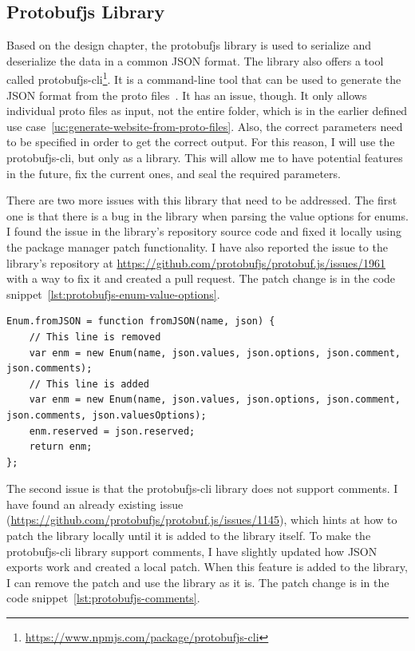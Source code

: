\subsection{Protobufjs Library}
Based on the design chapter, the protobufjs library is used to serialize and deserialize the data in a common JSON format.
The library also offers a tool called protobufjs-cli\footnote{\url{https://www.npmjs.com/package/protobufjs-cli}}.
It is a command-line tool that can be used to generate the JSON format from the proto files~\cite{protobufjs-cli}.
It has an issue, though.
It only allows individual proto files as input, not the entire folder, which is in the earlier defined use case~\ref{uc:generate-website-from-proto-files}.
Also, the correct parameters need to be specified in order to get the correct output.
For this reason, I will use the protobufjs-cli, but only as a library.
This will allow me to have potential features in the future, fix the current ones, and seal the required parameters.

There are two more issues with this library that need to be addressed.
The first one is that there is a bug in the library when parsing the value options for enums.
I found the issue in the library's repository source code and fixed it locally using the package manager patch functionality.
I have also reported the issue to the library's repository at \url{https://github.com/protobufjs/protobuf.js/issues/1961} with a way to fix it and created a pull request.
The patch change is in the code snippet~\ref{lst:protobufjs-enum-value-options}.

\newpage

\begin{lstlisting}[style=JavaScript, caption={protobufjs library enum comments bug fix}, label={lst:protobufjs-enum-value-options}]
Enum.fromJSON = function fromJSON(name, json) {
    // This line is removed
    var enm = new Enum(name, json.values, json.options, json.comment, json.comments);
    // This line is added
    var enm = new Enum(name, json.values, json.options, json.comment, json.comments, json.valuesOptions);
    enm.reserved = json.reserved;
    return enm;
};
\end{lstlisting}

The second issue is that the protobufjs-cli library does not support comments.
I have found an already existing issue (\url{https://github.com/protobufjs/protobuf.js/issues/1145}), which hints at how to patch the library locally until it is added to the library itself.
To make the protobufjs-cli library support comments, I have slightly updated how JSON exports work and created a local patch.
When this feature is added to the library, I can remove the patch and use the library as it is.
The patch change is in the code snippet~\ref{lst:protobufjs-comments}.

